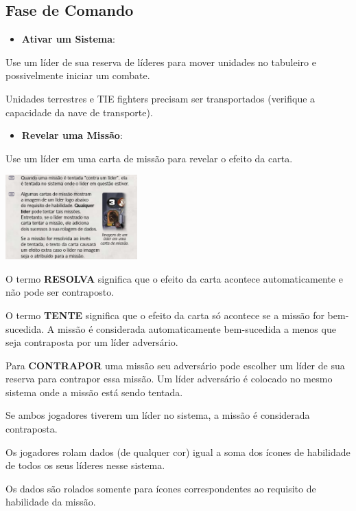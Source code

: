 \documentclass[11pt]{article}
\begin{document}
\subsection{Fase de Comando}
\label{sec:org284ca3c}

\begin{itemize}
\item \textbf{Ativar um Sistema}:
\end{itemize}

Use um líder de sua reserva de líderes para mover unidades no tabuleiro e possivelmente iniciar um combate.

Unidades terrestres e TIE fighters precisam ser transportados (verifique a capacidade da nave de transporte).

\begin{itemize}
\item \textbf{Revelar uma Missão}:
\end{itemize}

Use um líder em uma carta de missão para revelar o efeito da carta.

\begin{center}
\includegraphics[width=2.0in]{./lider-effect.png}
\end{center}

O termo \textbf{RESOLVA} significa que o efeito da carta acontece automaticamente e não pode ser contraposto.

O termo \textbf{TENTE} significa que o efeito da carta só acontece se a missão for bem-sucedida. A missão é considerada automaticamente bem-sucedida a menos que seja contraposta por um líder adversário.

Para \textbf{CONTRAPOR} uma missão seu adversário pode escolher um líder de sua reserva para contrapor essa missão. Um líder adversário é colocado no mesmo sistema onde a missão está sendo tentada.

Se ambos jogadores tiverem um líder no sistema, a missão é considerada contraposta.

Os jogadores rolam dados (de qualquer cor) igual a soma dos ícones de habilidade de todos os seus líderes nesse sistema.

Os dados são rolados somente para ícones correspondentes ao requisito de habilidade da missão.
\end{document}
